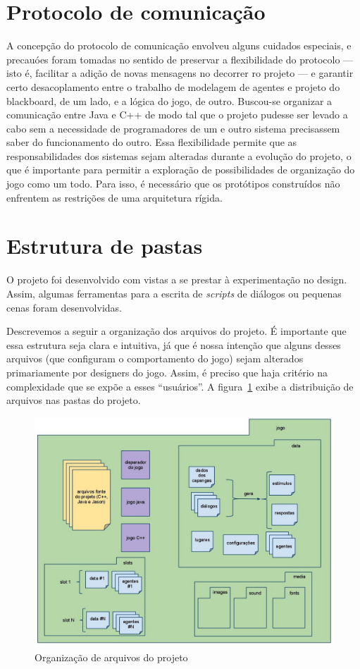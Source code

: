 \section{Protocolo de comunicação}

A concepção do protocolo de comunicação envolveu alguns cuidados especiais, e precauóes foram tomadas no sentido de preservar a flexibilidade do protocolo --- isto é, facilitar a adição de novas mensagens no decorrer ro projeto --- e garantir certo desacoplamento entre o trabalho de modelagem de agentes e projeto do blackboard, de um lado, e a lógica do jogo, de outro. Buscou-se organizar a comunicação entre Java e C++ de modo tal que o projeto pudesse ser levado a cabo sem a necessidade de programadores de um e outro sistema precisassem saber do funcionamento do outro. Essa flexibilidade permite que as responsabilidades dos sistemas sejam alteradas durante a evolução do projeto, o que é importante para permitir a exploração de possibilidades de organização do jogo como um todo. Para isso, é necessário que os protótipos construídos não enfrentem as restrições de uma arquitetura rígida.

\section{Estrutura de pastas}

O projeto foi desenvolvido com vistas a se prestar à experimentação no
design. Assim, algumas ferramentas para a escrita de \emph{scripts} de
diálogos ou pequenas cenas foram desenvolvidas.

Descrevemos a seguir a organização dos arquivos do projeto. É
importante que essa estrutura seja clara e intuitiva, já que é nossa
intenção que alguns desses arquivos (que configuram o comportamento
do jogo) sejam alterados primariamente por designers do jogo. Assim, é
preciso que haja critério na complexidade que se expõe a esses
``usuários''. A figura~\ref{fig:estrut-arquiv} exibe a distribuição de arquivos nas pastas do projeto.  

\begin{figure}
\centering
\includegraphics[width=\textwidth]{figuras/estrutura-arquivos.jpg}
\caption{Organização de arquivos do projeto}
\label{fig:estrut-arquiv}
\end{figure}


